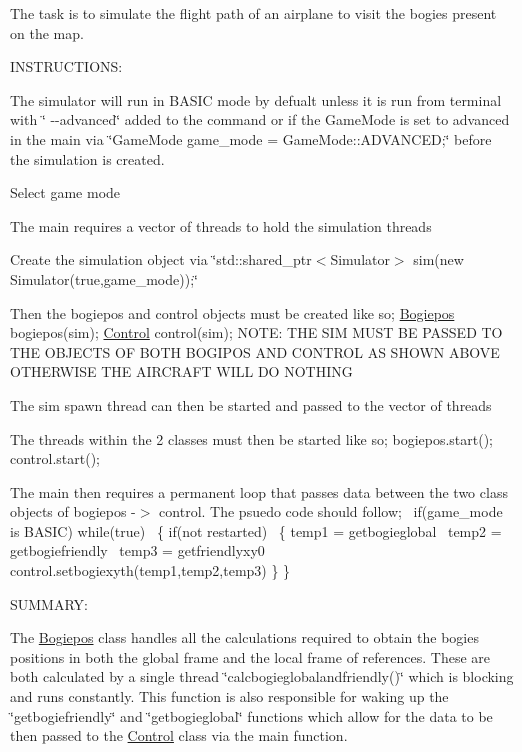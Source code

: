 The task is to simulate the flight path of an airplane to visit the bogies present on the map.

I\+N\+S\+T\+R\+U\+C\+T\+I\+O\+NS\+:

The simulator will run in B\+A\+S\+IC mode by defualt unless it is run from terminal with \char`\"{} -\/-\/advanced\char`\"{} added to the command or if the Game\+Mode is set to advanced in the main via \char`\"{}\+Game\+Mode game\+\_\+mode = Game\+Mode\+::\+A\+D\+V\+A\+N\+C\+E\+D;\char`\"{} before the simulation is created.
\begin{DoxyEnumerate}
\item Select game mode
\item The main requires a vector of threads to hold the simulation threads
\item Create the simulation object via \char`\"{}std\+::shared\+\_\+ptr$<$\+Simulator$>$ sim(new Simulator(true,game\+\_\+mode));\char`\"{}
\item Then the bogiepos and control objects must be created like so; \hyperlink{classBogiepos}{Bogiepos} bogiepos(sim); \hyperlink{classControl}{Control} control(sim); N\+O\+TE\+: T\+HE S\+IM M\+U\+ST BE P\+A\+S\+S\+ED TO T\+HE O\+B\+J\+E\+C\+TS OF B\+O\+TH B\+O\+G\+I\+P\+OS A\+ND C\+O\+N\+T\+R\+OL AS S\+H\+O\+WN A\+B\+O\+VE O\+T\+H\+E\+R\+W\+I\+SE T\+HE A\+I\+R\+C\+R\+A\+FT W\+I\+LL DO N\+O\+T\+H\+I\+NG
\item The sim spawn thread can then be started and passed to the vector of threads
\item The threads within the 2 classes must then be started like so; bogiepos.\+start(); control.\+start();
\item The main then requires a permanent loop that passes data between the two class objects of bogiepos -\/$>$ control. The psuedo code should follow;~\newline
 if(game\+\_\+mode is B\+A\+S\+I\+C) while(true)~\newline
 \{ if(not restarted)~\newline
 \{ temp1 = getbogieglobal~\newline
 temp2 = getbogiefriendly~\newline
 temp3 = getfriendlyxy0~\newline
 control.\+setbogiexyth(temp1,temp2,temp3) \} \}
\end{DoxyEnumerate}

S\+U\+M\+M\+A\+RY\+:

The \hyperlink{classBogiepos}{Bogiepos} class handles all the calculations required to obtain the bogies positions in both the global frame and the local frame of references. These are both calculated by a single thread \char`\"{}calcbogieglobalandfriendly()\char`\"{} which is blocking and runs constantly. This function is also responsible for waking up the \char`\"{}getbogiefriendly\char`\"{} and \char`\"{}getbogieglobal\char`\"{} functions which allow for the data to be then passed to the \hyperlink{classControl}{Control} class via the main function.

